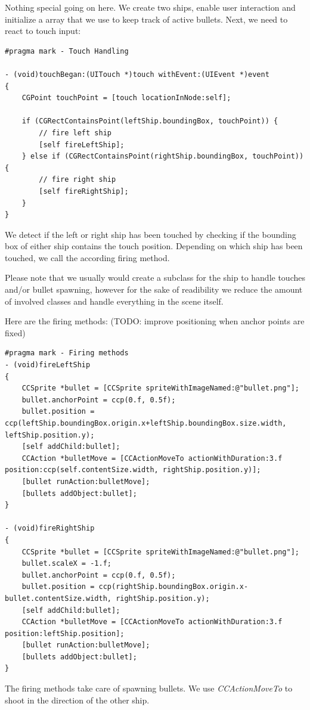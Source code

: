 \documentclass{scrreprt}
\begin{document}
Nothing special going on here. We create two ships, enable user interaction and
initialize a array that we use to keep track of active bullets.
Next, we need to react to touch input:
\begin{lstlisting}[title=examples/ParticleGamePlayScene.m]
#pragma mark - Touch Handling

- (void)touchBegan:(UITouch *)touch withEvent:(UIEvent *)event
{
    CGPoint touchPoint = [touch locationInNode:self];
    
    if (CGRectContainsPoint(leftShip.boundingBox, touchPoint)) {
        // fire left ship
        [self fireLeftShip];
    } else if (CGRectContainsPoint(rightShip.boundingBox, touchPoint)) {
        // fire right ship
        [self fireRightShip];
    }
}
\end{lstlisting}
We detect if the left or right ship has been touched by checking if the bounding
box of either ship contains the touch position. Depending on which ship has been
touched, we call the according firing method. 
\begin{lamp}[frametitle={Code Structure}] 
Please note that we usually would create a subclass for the ship to handle
touches and/or bullet spawning, however for the sake of readibility we reduce the amount of involved classes and handle everything in the scene itself.
\end{lamp}
Here are the firing methods: (TODO: improve positioning when anchor points are
fixed) 
\begin{lstlisting}[title=examples/ParticleGamePlayScene.m]
#pragma mark - Firing methods
- (void)fireLeftShip
{
    CCSprite *bullet = [CCSprite spriteWithImageNamed:@"bullet.png"];
    bullet.anchorPoint = ccp(0.f, 0.5f);
    bullet.position = ccp(leftShip.boundingBox.origin.x+leftShip.boundingBox.size.width, leftShip.position.y);
    [self addChild:bullet];
    CCAction *bulletMove = [CCActionMoveTo actionWithDuration:3.f position:ccp(self.contentSize.width, rightShip.position.y)];
    [bullet runAction:bulletMove];
    [bullets addObject:bullet];
}

- (void)fireRightShip
{
    CCSprite *bullet = [CCSprite spriteWithImageNamed:@"bullet.png"];
    bullet.scaleX = -1.f;
    bullet.anchorPoint = ccp(0.f, 0.5f);
    bullet.position = ccp(rightShip.boundingBox.origin.x-bullet.contentSize.width, rightShip.position.y);
    [self addChild:bullet];
    CCAction *bulletMove = [CCActionMoveTo actionWithDuration:3.f position:leftShip.position];
    [bullet runAction:bulletMove];
    [bullets addObject:bullet];
}
\end{lstlisting}
The firing methods take care of spawning bullets. We use \textit{CCActionMoveTo}
to shoot in the direction of the other ship. 
\end{document}
